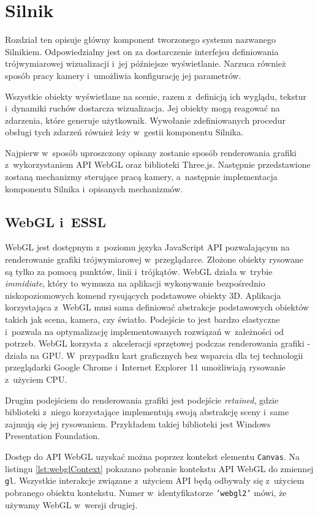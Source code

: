 \chapter{Silnik}

Rozdział ten opisuje główny komponent tworzonego systemu nazwanego Silnikiem. Odpowiedzialny jest on za dostarczenie interfejsu definiowania trójwymiarowej wizualizacji i~jej późniejsze wyświetlanie. Narzuca również sposób pracy kamery i~umożliwia konfigurację jej parametrów.

Wszystkie obiekty wyświetlane na scenie, razem z~definicją ich wyglądu, tekstur i~dynamiki ruchów dostarcza wizualizacja. Jej obiekty mogą reagować na zdarzenia, które generuje użytkownik. Wywołanie zdefiniowanych procedur obsługi tych zdarzeń również leży w~gestii komponentu Silnika.

Najpierw w~sposób uproszczony opisany zostanie sposób renderowania grafiki z~wykorzystaniem API WebGL oraz biblioteki Three.js. Następnie przedstawione zostaną mechanizmy sterujące pracą kamery, a~następnie implementacja komponentu Silnika i~opisanych mechanizmów.

\section{WebGL i~ESSL}

WebGL jest dostępnym z~poziomu języka JavaScript API pozwalającym na renderowanie grafiki trójwymiarowej w~przeglądarce. Złożone obiekty rysowane są tylko za pomocą punktów, linii i~trójkątów.  WebGL działa w~trybie \textit{immidiate}, który to wymusza na aplikacji wykonywanie bezpośrednio niskopoziomowych komend rysujących podstawowe obiekty 3D. Aplikacja korzystająca z~WebGL musi sama definiować abstrakcje podstawowych obiektów takich jak scena, kamera, czy światło. Podejście to jest bardzo elastyczne i~pozwala na optymalizację implementowanych rozwiązań w~zależności od potrzeb\cite[Rozdział 1]{RealTime3DGraphics}. WebGL korzysta z~akceleracji sprzętowej podczas renderowania grafiki - działa na GPU. W~przypadku kart graficznych bez wsparcia dla tej technologii przeglądarki Google Chrome i~Internet Explorer 11 umożliwiają rysowanie z~użyciem CPU.

Drugim podejściem do renderowania grafiki jest podejście \textit{retained}, gdzie biblioteki z~niego korzystające implementują swoją abstrakcję sceny i~same zajmują się jej rysowaniem. Przykładem takiej biblioteki jest Windows Presentation Foundation\cite{WPF}.

Dostęp do API WebGL uzyskać można poprzez kontekst elementu \texttt{Canvas}. Na listingu \ref{lst:webglContext} pokazano pobranie kontekstu API WebGL do zmiennej \texttt{gl}. Wszystkie interakcje związane z~użyciem API będą odbywały się z~użyciem pobranego obiektu kontekstu. Numer w~identyfikatorze \texttt{’webgl2’} mówi, że używamy WebGL w~wersji drugiej.


